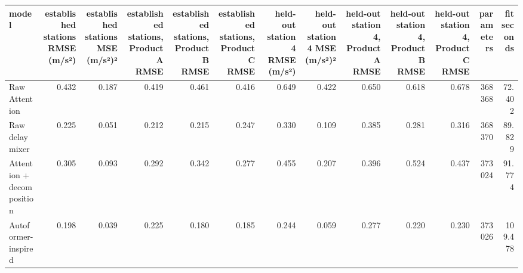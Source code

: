 \begin{tabular}{lrrrrrrrrrrrr}
\toprule
model & established stations RMSE (m/s²) & established stations MSE (m/s²)² & established stations, Product A RMSE & established stations, Product B RMSE & established stations, Product C RMSE & held-out station 4 RMSE (m/s²) & held-out station 4 MSE (m/s²)² & held-out station 4, Product A RMSE & held-out station 4, Product B RMSE & held-out station 4, Product C RMSE & parameters & fit seconds \\
\midrule
Raw Attention & 0.432 & 0.187 & 0.419 & 0.461 & 0.416 & 0.649 & 0.422 & 0.650 & 0.618 & 0.678 & 368368 & 72.402 \\
Raw delay mixer & 0.225 & 0.051 & 0.212 & 0.215 & 0.247 & 0.330 & 0.109 & 0.385 & 0.281 & 0.316 & 368370 & 89.829 \\
Attention + decomposition & 0.305 & 0.093 & 0.292 & 0.342 & 0.277 & 0.455 & 0.207 & 0.396 & 0.524 & 0.437 & 373024 & 91.774 \\
Autoformer-inspired & 0.198 & 0.039 & 0.225 & 0.180 & 0.185 & 0.244 & 0.059 & 0.277 & 0.220 & 0.230 & 373026 & 109.478 \\
\bottomrule
\end{tabular}
